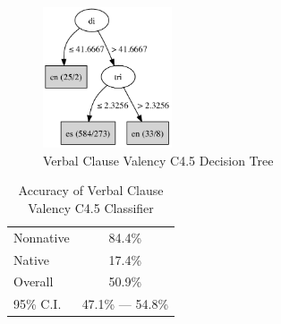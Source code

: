\documentclass[main.tex]{subfiles}
\begin{document}
\begin{figure}[ht]
\centering
\includegraphics[width=1.5in]{c45-val.pdf}
\caption{Verbal Clause Valency C4.5 Decision Tree}
\label{fig:c4.5-val}
\end{figure}

\begin{table}[ht]
\centering
\caption{Accuracy of Verbal Clause Valency C4.5 Classifier}
\begin{tabular}{l c}
\toprule
Nonnative & 84.4\% \\
Native & 17.4\% \\
Overall & 50.9\% \\
95\% C.I. & 47.1\% --- 54.8\%\\
\bottomrule
\end{tabular}
\label{table:val-results}
\end{table}
\end{document}
